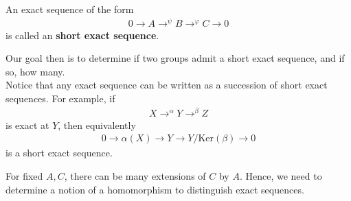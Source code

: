 \documentclass{memoir}
\begin{document}
\begin{defn}
	An exact sequence of the form
	\begin{align*}
		0 \to A \to^{\psi }B \to^{\varphi }C \to 0
	\end{align*}
	is called an \textbf{short exact sequence}.
\end{defn}
Our goal then is to determine if two groups admit a short exact sequence, and if so, how many.\\

Notice that any exact sequence can be written as a succession of short exact sequences. For example, if
\begin{align*}
	X \to^{\alpha }Y \to^{\beta }Z
\end{align*}
is exact at \(Y\), then equivalently
\begin{align*}
	0 \to \alpha (X) \to Y \to Y / \textrm{Ker}(\beta ) \to 0
\end{align*}
is a short exact sequence.

\begin{exmp}
	
\end{exmp}

For fixed \(A,C\), there can be many extensions of \(C\) by  \(A\). Hence, we need to determine a notion of a homomorphism to distinguish exact sequences.
\end{document}
